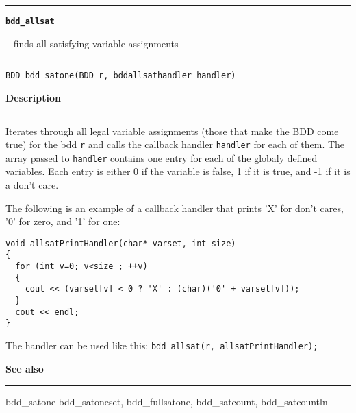 \begin{minipage}{\textwidth}

\noindent\begin{minipage}{\textwidth}
\rule{\textwidth}{0.5mm}
{\tt\bf bdd\_allsat }
\--- finds all satisfying variable assignments  \hspace{\fill}
\\\rule[1.5ex]{\textwidth}{0.5mm}
\end{minipage}

\noindent\begin{verbatim}
BDD bdd_satone(BDD r, bddallsathandler handler) 
\end{verbatim}

\vspace{\parsep}\noindent
{\bf Description}\\\rule[1.5ex]{\textwidth}{0.2mm}\vspace{-1.5ex}\setlength{\parindent}{1em}
Iterates through all legal variable assignments (those
           that make the BDD come true) for the  bdd {\tt r} and
	   calls the callback handler {\tt handler} for each of them.
	   The array passed to {\tt handler} contains one entry for
	   each of the globaly defined variables. Each entry is either
	   0 if the variable is false, 1 if it is true, and -1 if it
	   is a don't care.

	   The following is an example of a callback handler that
	   prints 'X' for don't cares, '0' for zero, and '1' for one:
	   \begin{verbatim}
void allsatPrintHandler(char* varset, int size)
{
  for (int v=0; v<size ; ++v)
  {
    cout << (varset[v] < 0 ? 'X' : (char)('0' + varset[v]));
  }
  cout << endl;
}
\end{verbatim}

           \noindent
	   The handler can be used like this:
	   {\tt bdd\_allsat(r, allsatPrintHandler); } 

\vspace{\parsep}\vspace{\baselineskip}\noindent
{\bf See also}\\\rule[1.5ex]{\textwidth}{0.2mm}\vspace{-1.5ex}
bdd\_satone bdd\_satoneset, bdd\_fullsatone, bdd\_satcount, bdd\_satcountln 
\end{minipage}
\vspace{8ex}
